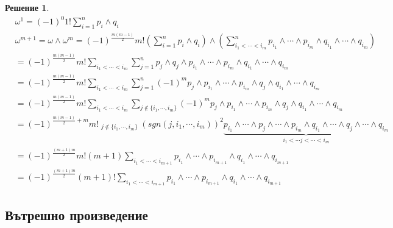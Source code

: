 \documentclass[12pt]{article}
\newtheorem*{solution*}{Решение}
\begin{document}
\begin{large}
\begin{solution*}
  \begin{align*}
    &\omega^1 =  (-1)^0 1! \sum_{i=1}^n p_i \wedge q_i \\
    &\omega^{m+1} = \omega \wedge \omega^m = (-1)^{\frac{m(m-1)}{2}} m! (\sum_{i=1}^n p_i \wedge q_i) \wedge (\sum_{i_1<\cdots<i_m}^n p_{i_1} \wedge \cdots  \wedge p_{i_m} \wedge q_{i_1} \wedge \cdots \wedge q_{i_m}) \\
    &=(-1)^{\frac{m(m-1)}{2}}m! \sum_{i_1<\cdots<i_m} \sum_{j=1}^n p_j \wedge q_j \wedge p_{i_1} \wedge \cdots  \wedge p_{i_m} \wedge q_{i_1} \wedge \cdots \wedge q_{i_m} \\
    &=(-1)^{\frac{m(m-1)}{2}}m! \sum_{i_1<\cdots<i_m} \sum_{j=1}^n (-1)^{m}  p_j  \wedge p_{i_1} \wedge \cdots \wedge p_{i_m} \wedge q_j \wedge q_{i_1} \wedge \cdots \wedge q_{i_m} \\
    &=(-1)^{\frac{m(m-1)}{2}}m! \sum_{i_1<\cdots<i_m} \sum_{j \not \in \{i_1,\cdots, i_m\}} (-1)^{m}  p_j  \wedge p_{i_1} \wedge \cdots \wedge p_{i_m} \wedge q_j \wedge q_{i_1} \wedge \cdots \wedge q_{i_m} \\
    &=(-1)^{\frac{m(m-1)}{2}+m}m! \mathop{\sum_{i_1<\cdots<i_m}}_{j \not \in \{i_1,\cdots, i_m\}} (sgn(j,i_1,\cdots,i_m))^2  \underbrace{p_{i_1} \wedge \cdots \wedge p_j  \wedge \cdots \wedge p_{i_m} \wedge q_{i_1} \wedge \cdots \wedge q_j  \wedge  \cdots \wedge q_{i_m}}_{i_1<\cdots j < \cdots < i_m} \\
    &=(-1)^{\frac{(m+1)m}{2}}m!(m+1)\sum_{i_1<\cdots<i_{m+1}} p_{i_1} \wedge \cdots  \wedge p_{i_{m+1}} \wedge q_{i_1} \wedge \cdots \wedge q_{i_{m+1}} \\
    &=(-1)^{\frac{(m+1)m}{2}}(m+1)!\sum_{i_1<\cdots<i_{m+1}} p_{i_1} \wedge \cdots  \wedge p_{i_{m+1}} \wedge q_{i_1} \wedge \cdots \wedge q_{i_{m+1}}
  \end{align*}
\end{solution*}

\subsection{Вътрешно произведение}


\end{large}
\end{document}
